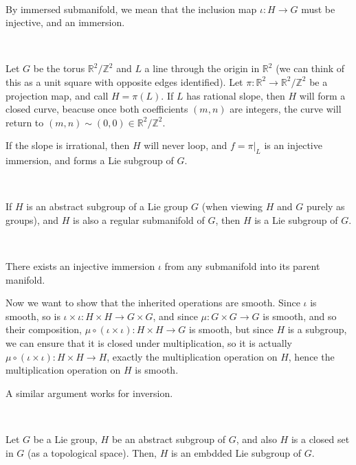 \documentclass{article}
\begin{document}
\begin{remark}
  \

  By immersed submanifold, we mean that the inclusion map $\iota: H \to G$ must be injective, and an immersion.
\end{remark}

\begin{example}
  \

  Let $G$ be the torus $\mathbb{R}^2/ \mathbb{Z}^2$ and $L$ a line through the origin in $\mathbb{R}^2$ (we can think of this as a unit square with opposite edges identified). Let $\pi: \mathbb{R}^2 \to \mathbb{R}^2/ \mathbb{Z}^2$ be a projection map, and call $H = \pi(L)$. If $L$ has rational slope, then $H$ will form a closed curve, beacuse once both coefficients $(m,n)$ are integers, the curve will return to $(m,n) \sim (0,0) \in \mathbb{R}^2/ \mathbb{Z}^2$.

  If the slope is irrational, then $H$ will never loop, and $f = \pi \vert_L$ is an injective immersion, and forms a Lie subgroup of $G$.
\end{example}

\begin{proposition}
  \

  If $H$ is an abstract subgroup of a Lie group $G$ (when viewing $H$ and $G$ purely as groups), and $H$ is also a regular submanifold of $G$, then $H$ is a Lie subgroup of $G$.
\end{proposition}

\begin{customproof}
  \

  There exists an injective immersion $\iota$ from any submanifold into its parent manifold.

  Now we want to show that the inherited operations are smooth. Since $\iota$ is smooth, so is $\iota \times \iota: H \times H \to G \times G$, and since $\mu: G \times G\to G$ is smooth, and so their composition, $\mu \circ (\iota \times \iota): H \times H \to G$ is smooth, but since $H$ is a subgroup, we can ensure that it is closed under multiplication, so it is actually $\mu \circ (\iota \times \iota): H \times H \to H$, exactly the multiplication operation on $H$, hence the multiplication operation on $H$ is smooth.

  A similar argument works for inversion.
\end{customproof}

\begin{theorem}
  \

  Let $G$ be a Lie group, $H$ be an abstract subgroup of $G$, and also $H$ is a closed set in $G$ (as a topological space). Then, $H$ is an embdded Lie subgroup of $G$.
\end{theorem}
\end{document}
